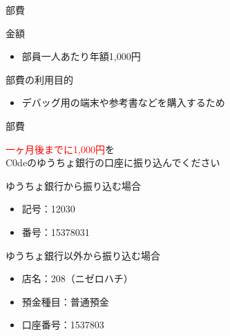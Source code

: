 \documentclass[12pt, unicode]{beamer}
\begin{document}
\begin{frame}{部費}
    \begin{block}{金額}
        \begin{itemize}
            \item 部員一人あたり年額1,000円
        \end{itemize}
    \end{block}

    \begin{block}{部費の利用目的}
        \begin{itemize}
            \item デバッグ用の端末や参考書などを購入するため
        \end{itemize}
    \end{block}
\end{frame}

\begin{frame}{部費}
    \begin{center}
        {\large \textcolor{red}{一ヶ月後までに1,000円}を\\C0deのゆうちょ銀行の口座に振り込んでください}
    \end{center}

    \begin{block}{ゆうちょ銀行から振り込む場合}
        \begin{itemize}
            \item 記号：12030
            \item 番号：15378031
        \end{itemize}
    \end{block}

    \begin{block}{ゆうちょ銀行以外から振り込む場合}
        \begin{itemize}
            \item 店名：208（ニゼロハチ）
            \item 預金種目：普通預金
            \item 口座番号：1537803
        \end{itemize}
    \end{block}
\end{frame}
\end{document}
